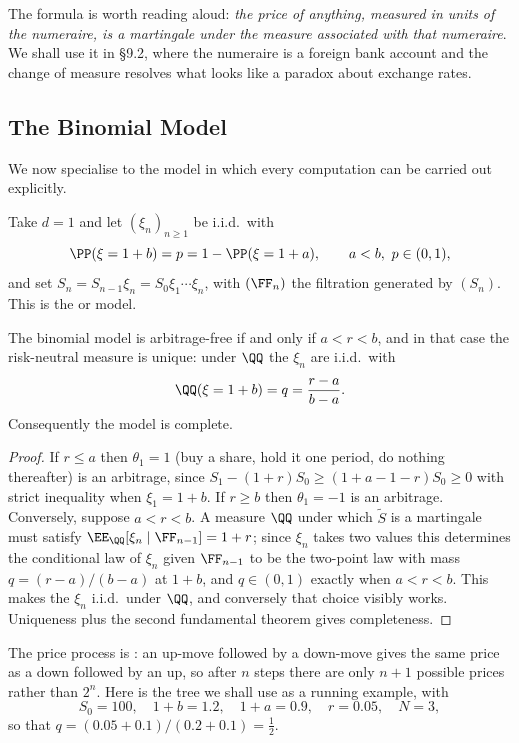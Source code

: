 The formula is worth reading aloud: \emph{the price of anything, measured in units of the numeraire, is a martingale under the measure associated with that numeraire}. We shall use it in \S9.2, where the numeraire is a foreign bank account and the change of measure resolves what looks like a paradox about exchange rates.

\subsection{The Binomial Model}

We now specialise to the model in which every computation can be carried out explicitly.

\begin{definition}
	Take $d = 1$ and let $(\xi_n)_{n \geq 1}$ be i.i.d.\ with
	$$
	\PP(\xi = 1+b) = p = 1 - \PP(\xi = 1+a), \qquad a < b,\ p \in (0,1),
	$$
	and set $S_n = S_{n-1}\xi_n = S_0\xi_1\cdots\xi_n$, with $(\FF_n)$ the filtration generated by $(S_n)$. This is the  or  model.
\end{definition}

\begin{proposition}\label{prop:crr-na}
	The binomial model is arbitrage-free if and only if $a < r < b$, and in that case the risk-neutral measure is unique: under $\QQ$ the $\xi_n$ are i.i.d.\ with
	$$
	\QQ(\xi = 1+b) = q = \frac{r-a}{b-a}.
	$$
	Consequently the model is complete.
\end{proposition}

\begin{proof}
	If $r \leq a$ then $\theta_1 = 1$ (buy a share, hold it one period, do nothing thereafter) is an arbitrage, since $S_1 - (1+r)S_0 \geq (1+a-1-r)S_0\geq0$ with strict inequality when $\xi_1 = 1+b$. If $r \geq b$ then $\theta_1 = -1$ is an arbitrage. Conversely, suppose $a<r<b$. A measure $\QQ$ under which $\tilde S$ is a martingale must satisfy $\EE_\QQ[\xi_n \mid \FF_{n-1}] = 1+r$; since $\xi_n$ takes two values this determines the conditional law of $\xi_n$ given $\FF_{n-1}$ to be the two-point law with mass $q = (r-a)/(b-a)$ at $1+b$, and $q\in(0,1)$ exactly when $a<r<b$. This makes the $\xi_n$ i.i.d.\ under $\QQ$, and conversely that choice visibly works. Uniqueness plus the second fundamental theorem gives completeness.
\end{proof}

The price process is : an up-move followed by a down-move gives the same price as a down followed by an up, so after $n$ steps there are only $n+1$ possible prices rather than $2^n$. Here is the tree we shall use as a running example, with
$$
S_0 = 100,\quad 1+b = 1.2,\quad 1+a = 0.9,\quad r = 0.05,\quad N = 3,
$$
so that $q = (0.05+0.1)/(0.2+0.1) = \tfrac12$.

